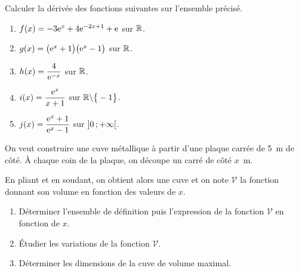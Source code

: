 \documentclass[a4paper,11pt]{article}
\begin{document}
\begin{cexercice}
Calculer la dérivée des fonctions suivantes sur l’ensemble précisé.
%
\begin{enumerate}
	\item $f(x)=-3{\rm e}^x+4{\rm e}^{-2x+1}+{\rm e}$ sur $\R$.
	\item $g(x)=\big({\rm e}^x+1\big)\big({\rm e}^x-1\big)$ sur $\R$.
	\item $h(x)=\dfrac{4}{{\rm e}^{-x}}$ sur $\R$.
	\item $i(x)=\dfrac{{\rm e}^x}{x+1}$ sur $\R\backslash\bigr\{ -1 \bigr\}$.
	\item $j(x)=\dfrac{{\rm e}^x+1}{{\rm e}^x-1}$ sur $\mbox{\ensuremath{\left]0\mathpunct{};+\infty\right[}}$.
\end{enumerate}
\end{cexercice}

\begin{cexercice}
On veut construire une cuve métallique à partir d’une plaque carrée de 5~m de côté. À chaque coin de la plaque, on
découpe un carré de côté $x$~m.

En pliant et en soudant, on obtient alors une cuve et on note $\mathscr{V}$ la fonction donnant son volume en fonction des valeurs de $x$.
%
\begin{center}
\end{center}
%
\begin{enumerate}
	\item Déterminer l’ensemble de définition puis l’expression de la fonction $\mathscr{V}$ en fonction de $x$.
	\item Étudier les variations de la fonction $\mathscr{V}$.
	\item Déterminer les dimensions de la cuve de volume maximal.
\end{enumerate}
\end{cexercice}
\end{document}
